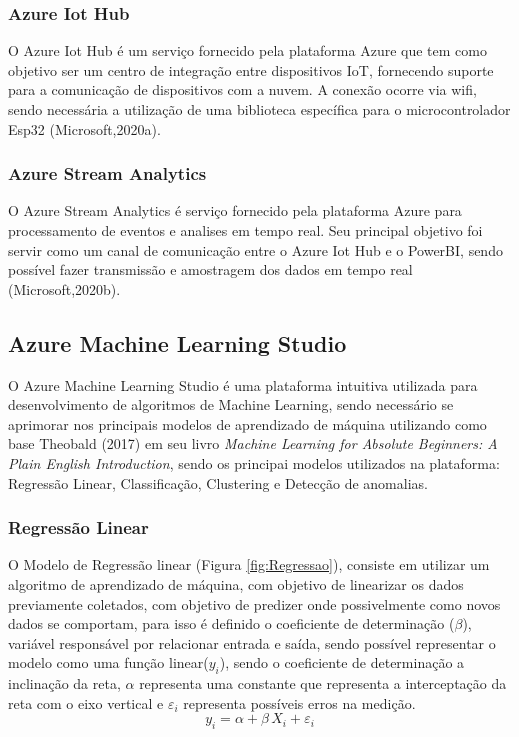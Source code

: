 \documentclass[
	article,			%
	12pt,				%
	oneside,			%
	a4paper,			%
	section=TITLE,		%
	subsection=TITLE,	%
	english,			%
	brazil,				%
	sumario=tradicional
	]{abntex2}
\begin{document}
\subsubsection*{Azure Iot Hub}
O Azure Iot Hub é um serviço fornecido pela plataforma Azure que tem como objetivo ser um centro de integração entre dispositivos IoT, fornecendo suporte para a comunicação de dispositivos com a nuvem. A conexão ocorre via wifi, sendo necessária a utilização de uma biblioteca específica para o microcontrolador Esp32 (Microsoft,2020a).
\subsubsection*{Azure Stream Analytics}
O Azure Stream Analytics é serviço fornecido pela plataforma Azure para processamento de eventos e analises em tempo real. Seu principal objetivo foi servir como um canal de comunicação entre o Azure Iot Hub e o PowerBI, sendo possível fazer transmissão e amostragem dos dados em tempo real (Microsoft,2020b).

\subsection*{Azure Machine Learning Studio}
O Azure Machine Learning Studio é uma plataforma intuitiva utilizada para desenvolvimento de algoritmos de Machine Learning, sendo necessário se aprimorar nos principais modelos de aprendizado de máquina utilizando como base Theobald (2017) em seu livro \textit{Machine Learning for Absolute Beginners: A Plain English Introduction}, sendo os principai modelos utilizados na plataforma: Regressão Linear, Classificação, Clustering e Detecção de anomalias.
\subsubsection*{Regressão Linear}
O Modelo de Regressão linear (Figura \ref{fig:Regressao}), consiste em utilizar um algoritmo de aprendizado de máquina, com objetivo de linearizar os dados previamente coletados, com objetivo de predizer onde possivelmente como novos dados se comportam, para isso é definido o coeficiente de determinação ($\beta$), variável responsável por relacionar entrada e saída, sendo possível representar o modelo como uma função linear($y_{i}$), sendo o coeficiente de determinação a inclinação da reta, $\alpha$ representa uma constante que representa a interceptação da reta com o eixo vertical e $\varepsilon _{i}$ representa possíveis erros na medição.
\begin{equation}
    { y_{i}=\alpha +\beta \,X_{i}+\varepsilon _{i}}
\end{equation}
\end{document}
